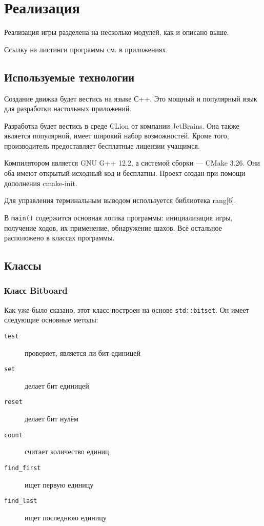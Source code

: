 \chapter{Реализация}

Реализация игры разделена на несколько модулей, как и описано выше. 

Ссылку на листинги программы см. в приложениях.

\section{Используемые технологии}

Создание движка будет вестись на языке С++. Это мощный и  популярный язык для разработки настольных приложений.

Разработка будет вестись в среде CLion от компании JetBrains. Она также является популярной, имеет широкий набор возможностей. Кроме того, производитель предоставляет бесплатные лицензии учащимся. 

Компилятором является GNU G++ 12.2, а системой сборки --- CMake 3.26. Они оба имеют открытый исходный код и бесплатны. Проект создан при помощи дополнения cmake-init.

Для управления терминальным выводом используется библиотека rang[6].

В \texttt{main()} содержится основная логика программы: инициализация игры, получение ходов, их применение, обнаружение шахов. Всё остальное расположено в классах программы.

\section{Классы}

\subsection*{Класс Bitboard}

Как уже было сказано, этот класс построен на основе \texttt{std::bitset}. Он имеет следующие основные методы:
\begin{description}
	\item[\texttt{test}] проверяет, является ли бит единицей
	\item[\texttt{set}] делает бит единицей
	\item[\texttt{reset}] делает бит нулём
	\item[\texttt{count}] считает количество единиц
	\item[\texttt{find\_first}] ищет первую единицу
	\item[\texttt{find\_last}] ищет последнюю единицу
\end{description}

